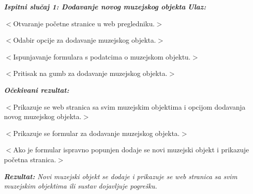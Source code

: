 			 \textit{\textbf{Ispitni slučaj 1: Dodavanje novog muzejskog objekta}}
			 \newline
			 \textit{\textbf{Ulaz:}}
			 \begin{packed_enum}	
			 	\item $<$Otvaranje početne stranice u web pregledniku.$>$
			 	\item $<$Odabir opcije za dodavanje muzejskog objekta.$>$
			 	\item $<$Ispunjavanje formulara s podatcima o muzejskom objektu.$>$
			 	\item $<$Pritisak na gumb za dodavanje muzejskog objekta.$>$
			 \end{packed_enum}
			 \textit{\textbf{Očekivani rezultat:}}
			 \begin{packed_enum}
				 \item $<$Prikazuje se web stranica sa svim muzejskim objektima i opcijom dodavanja novog muzejskog objekta.$>$
				 \item $<$Prikazuje se formular za dodavanje muzejskog objekta.$>$
				 \item $<$Ako je formular ispravno popunjen dodaje se novi muzejski objekt i prikazuje početna stranica.$>$ 
			 \end{packed_enum}
			 \textit{\textbf{Rezultat:} Novi muzejski objekt se dodaje i prikazuje se web stranica sa svim muzejskim objektima ili sustav dojavljuje pogrešku.
			 \newline}
